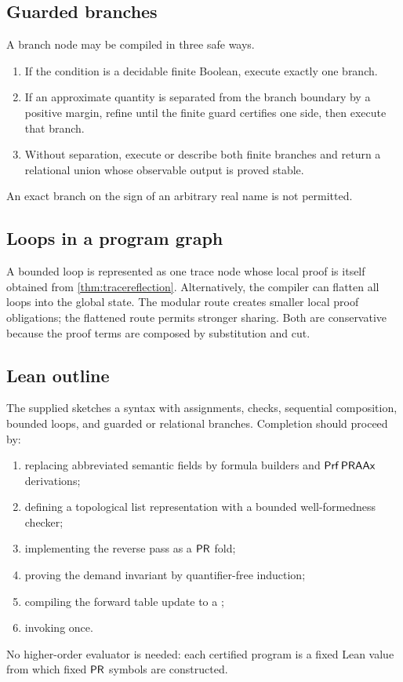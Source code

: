 \subsection{Guarded branches}

A branch node may be compiled in three safe ways.
\begin{enumerate}
\item If the condition is a decidable finite Boolean, execute exactly one
branch.
\item If an approximate quantity is separated from the branch boundary by a
positive margin, refine until the finite guard certifies one side, then execute
that branch.
\item Without separation, execute or describe both finite branches and return
a relational union whose observable output is proved stable.
\end{enumerate}
An exact branch on the sign of an arbitrary real name is not permitted.

\subsection{Loops in a program graph}

A bounded loop is represented as one trace node whose local proof is itself
obtained from \cref{thm:tracereflection}.  Alternatively, the compiler can
flatten all loops into the global state.  The modular route creates smaller
local proof obligations; the flattened route permits stronger sharing.  Both
are conservative because the proof terms are composed by substitution and cut.

\subsection{Lean outline}

The supplied  sketches a syntax with assignments,
checks, sequential composition, bounded loops, and guarded or relational
branches.  Completion should proceed by:
\begin{enumerate}
\item replacing abbreviated semantic fields by formula builders and
\(\mathsf{Prf}\,\mathsf{PRAAx}\) derivations;
\item defining a topological list representation with a bounded well-formedness
checker;
\item implementing the reverse pass as a \(\mathsf{PR}\) fold;
\item proving the demand invariant by quantifier-free induction;
\item compiling the forward table update to a ;
\item invoking  once.
\end{enumerate}
No higher-order evaluator is needed: each certified program is a fixed Lean
value from which fixed \(\mathsf{PR}\) symbols are constructed.

